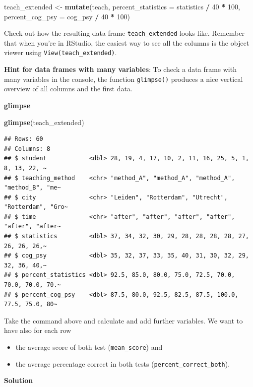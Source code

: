 \documentclass[
]{scrartcl}
\makeatletter
\newenvironment{Shaded}{\begin{snugshade}}{\end{snugshade}}
\newcommand{\AttributeTok}[1]{\textcolor[rgb]{0.13,0.29,0.53}{#1}}
\newcommand{\DecValTok}[1]{\textcolor[rgb]{0.00,0.00,0.81}{#1}}
\newcommand{\FunctionTok}[1]{\textcolor[rgb]{0.13,0.29,0.53}{\textbf{#1}}}
\newcommand{\NormalTok}[1]{#1}
\newcommand{\OtherTok}[1]{\textcolor[rgb]{0.56,0.35,0.01}{#1}}
\newcommand{\SpecialCharTok}[1]{\textcolor[rgb]{0.81,0.36,0.00}{\textbf{#1}}}
\providecommand{\tightlist}{%
  \setlength{\itemsep}{0pt}\setlength{\parskip}{0pt}}
\newenvironment{kframe}{%
\medskip{}
\setlength{\fboxsep}{.8em}
 \def\at@end@of@kframe{}%
 \ifinner\ifhmode%
  \def\at@end@of@kframe{\end{minipage}}%
  \begin{minipage}{\columnwidth}%
 \fi\fi%
 \def\FrameCommand##1{\hskip\@totalleftmargin \hskip-\fboxsep
 \colorbox{shadecolor}{##1}\hskip-\fboxsep
     \hskip-\linewidth \hskip-\@totalleftmargin \hskip\columnwidth}%
 \MakeFramed {\advance\hsize-\width
   \@totalleftmargin\z@ \linewidth\hsize
   \@setminipage}}%
 {\par\unskip\endMakeFramed%
 \at@end@of@kframe}
\newenvironment{rmdblock}[1]
  {
  \begin{itemize}
  \renewcommand{\labelitemi}{
    \raisebox{-.7\height}[0pt][0pt]{
      {\setkeys{Gin}{width=3em,keepaspectratio}\texttt{[image: images/\#1]}}
    }
  }
  \setlength{\fboxsep}{1em}
  \begin{kframe}
  \item
  }
  {
  \end{kframe}
  \end{itemize}
  }
\newenvironment{myexercise}
    {\begin{rmdblock}{exercise_green}}
    {\end{rmdblock}}
\newenvironment{webexsolution}[1]
    {\par\tiny\textbf{#1}}
    {\par}
\newcommand{\webexhide}[1]{\begin{webexsolution}{#1}}
\newcommand{\webexunhide}{\end{webexsolution}}
\makeatother
\begin{document}
\begin{Shaded}
\begin{Highlighting}[]
\NormalTok{teach\_extended }\OtherTok{\textless{}{-}} \FunctionTok{mutate}\NormalTok{(teach,}
                    \AttributeTok{percent\_statistics =}\NormalTok{ statistics }\SpecialCharTok{/} \DecValTok{40} \SpecialCharTok{*} \DecValTok{100}\NormalTok{,}
                    \AttributeTok{percent\_cog\_psy =}\NormalTok{ cog\_psy }\SpecialCharTok{/} \DecValTok{40} \SpecialCharTok{*} \DecValTok{100}\NormalTok{)}
\end{Highlighting}
\end{Shaded}

Check out how the resulting data frame \texttt{teach\_extended} looks like. Remember that when you're in RStudio, the easiest way to see all the columns is the object viewer using \texttt{View(teach\_extended)}.

\textbf{Hint for data frames with many variables}: To check a data frame with many variables in the console, the function \texttt{glimpse()} produces a nice vertical overview of all columns and the first data.

\webexhide{glimpse}

\begin{Shaded}
\begin{Highlighting}[]
\FunctionTok{glimpse}\NormalTok{(teach\_extended)}
\end{Highlighting}
\end{Shaded}

\begin{verbatim}
## Rows: 60
## Columns: 8
## $ student            <dbl> 28, 19, 4, 17, 10, 2, 11, 16, 25, 5, 1, 8, 13, 22, ~
## $ teaching_method    <chr> "method_A", "method_A", "method_A", "method_B", "me~
## $ city               <chr> "Leiden", "Rotterdam", "Utrecht", "Rotterdam", "Gro~
## $ time               <chr> "after", "after", "after", "after", "after", "after~
## $ statistics         <dbl> 37, 34, 32, 30, 29, 28, 28, 28, 28, 27, 26, 26, 26,~
## $ cog_psy            <dbl> 35, 32, 37, 33, 35, 40, 31, 30, 32, 29, 32, 36, 40,~
## $ percent_statistics <dbl> 92.5, 85.0, 80.0, 75.0, 72.5, 70.0, 70.0, 70.0, 70.~
## $ percent_cog_psy    <dbl> 87.5, 80.0, 92.5, 82.5, 87.5, 100.0, 77.5, 75.0, 80~
\end{verbatim}

\webexunhide

\begin{myexercise}
 Take the command above and calculate and add further variables. We want
 to have also for each row
 
 \begin{itemize}
 \tightlist
 \item
   the average score of both test (\texttt{mean\_score}) and
 \item
   the average percentage correct in both tests
   (\texttt{percent\_correct\_both}).
 \end{itemize}
 \end{myexercise}
\webexhide{Solution}
\end{document}
